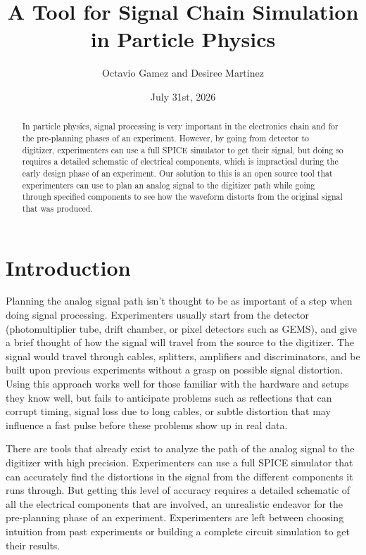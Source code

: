 \documentclass[10pt]{article}
\title{A Tool for Signal Chain Simulation in Particle Physics}
\author{Octavio Gamez and Desiree Martinez}
\date{July 31st, 2026}
\begin{document}
\maketitle

\begin{abstract}

In particle physics, signal processing is very important in the electronics chain and for the pre-planning phases of an experiment. However, by going from detector to digitizer, experimenters can use a full SPICE simulator to get their signal, but doing so requires a detailed schematic of electrical components, which is impractical during the early design phase of an experiment. Our solution to this is an open source tool that experimenters can use to plan an analog signal to the digitizer path while going through specified components to see how the waveform distorts from the original signal that was produced.
  
\end{abstract}

\section{Introduction}

Planning the analog signal path isn't thought to be as important of a step when doing signal processing. Experimenters usually start from the detector (photomultiplier tube, drift chamber, or pixel detectors such as GEMS), and give a brief thought of how the signal will travel from the source to the digitizer. The signal would travel through cables, splitters, amplifiers and discriminators, and be built upon previous experiments without a grasp on possible signal distortion. Using this approach works well for those familiar with the hardware and setups they know well, but fails to anticipate problems such as reflections that can corrupt timing, signal loss due to long cables, or subtle distortion that may influence a fast pulse before these problems show up in real data.

There are tools that already exist to analyze the path of the analog signal to the digitizer with high precision. Experimenters can use a full SPICE simulator that can accurately find the distortions in the signal from the different components it runs through. But getting this level of accuracy requires a detailed schematic of all the electrical components that are involved, an unrealistic endeavor for the pre-planning phase of an experiment. Experimenters are left between choosing intuition from past experiments or building a complete circuit simulation to get their results.
\end{document}
